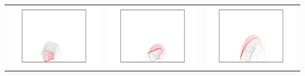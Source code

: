 \documentclass[11pt]{article}
\begin{document}
\begin{center}
\begin{tabular}{ccc}
\includegraphics[scale = 0.26]{simA_05.pdf} & \includegraphics[scale = 0.26]{simB_05.pdf} & \includegraphics[scale = 0.26]{simC_05.pdf} \\

\end{tabular}
\end{center}
\end{document}
